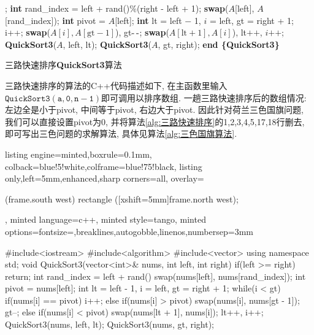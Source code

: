\documentclass{article}
\begin{document}
\begin{homeworkProblem}
\begin{algorithm}[H]
\begin{algorithmic}[1]
			\State \Return;
		\EndIf
		\State \textbf{int} rand_index = left + rand()$\%$(right - left + 1);
		\State \textbf{swap}($A$[left], $A$[rand_index]);
		\State \textbf{int} pivot = $A$[left];
		\State \textbf{int} lt = left $-$ 1, $i$ = left, gt = right + 1;
				\State i++;
				\State \textbf{swap}($A[i],A[\text{gt}-1]$), gt$\text{-\,-}$;
				\State \textbf{swap}($A[\text{lt}+1],A[i]$), lt$\text{++}$, $i\text{++}$;
			\EndIf
		\EndWhile
		\State \textbf{QuickSort3}($A$, left, lt);
		\State \textbf{QuickSort3}($A$, gt, right);
		\State \textbf{end \{QuickSort3\}}
		\end{algorithmic}
		\caption{三路快速排序\textbf{QuickSort3}算法}
		\label{alg:三路快速排序}
	\end{algorithm}


	三路快速排序的算法的C++代码描述如下, 在主函数里输入$\mathtt{QuickSort3(a, 0, n - 1)}$即可调用以排序数组. 一趟三路快速排序后的数组情况: 左边全是小于pivot, 中间等于pivot, 右边大于pivot. 因此针对荷兰三色国旗问题, 我们可以直接设置pivot为0, 并将算法\ref{alg:三路快速排序}的1,2,3,4,5,17,18行删去, 即可写出三色问题的求解算法, 具体见算法\ref{alg:三色国旗算法}.

\begin{tcblisting}{listing engine=minted,boxrule=0.1mm,
colback=blue!5!white,colframe=blue!75!black,
listing only,left=5mm,enhanced,sharp corners=all,
overlay={\begin{tcbclipinterior} (frame.south west)
rectangle ([xshift=5mm]frame.north west);\end{tcbclipinterior}},
minted language=c++,
minted style=tango,
minted options={fontsize=\small,breaklines,autogobble,linenos,numbersep=3mm}}
#include<iostream>
#include<algorithm>
#include<vector>
using namespace std;
void QuickSort3(vector<int>& nums, int left, int right) {
    if(left >= right) {
        return;
    }
    int rand_index = left + rand()%
    swap(nums[left], nums[rand_index]);
    int pivot = nums[left];
    int lt = left - 1, i = left, gt = right + 1;
    while(i < gt) {
        if(nums[i] == pivot) {
            i++;
        }
        else if(nums[i] > pivot) {
            swap(nums[i], nums[gt - 1]);
            gt--;
        }
        else if(nums[i] < pivot) {
            swap(nums[lt + 1], nums[i]);
            lt++, i++;
        }
    }
    QuickSort3(nums, left, lt);
    QuickSort3(nums, gt, right);
}
\end{tcblisting}


\end{homeworkProblem}
\end{document}
